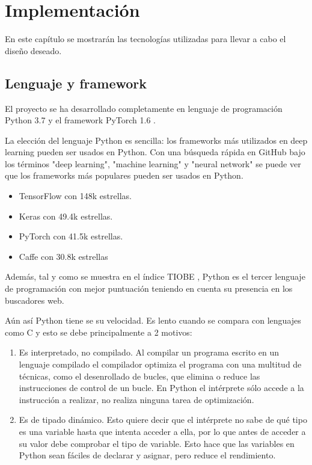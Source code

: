 \chapter{Implementación}\label{implementacion}

En este capítulo se mostrarán las tecnologías utilizadas para llevar a cabo el diseño deseado.

\section{Lenguaje y framework}\label{sec:language_framework}

El proyecto se ha desarrollado completamente en lenguaje de programación Python 3.7 y el framework PyTorch 1.6 \cite{Paszke2019}.

La elección del lenguaje Python es sencilla: los frameworks más utilizados en deep learning pueden ser usados en Python. Con una búsqueda rápida en GitHub bajo los términos "deep learning", "machine learning" y "neural network" se puede ver que los frameworks más populares pueden ser usados en Python.
\begin{itemize}
\item TensorFlow con 148k estrellas.
\item Keras con 49.4k estrellas.
\item PyTorch con 41.5k estrellas.
\item Caffe con 30.8k estrellas
\end{itemize}

Además, tal y como se muestra en el índice TIOBE \cite{Tiobe2020}, Python es el tercer lenguaje de programación con mejor puntuación teniendo en cuenta su presencia en los buscadores web.

Aún así Python tiene se su velocidad. Es lento cuando se compara con lenguajes como C y esto se debe principalmente a 2 motivos:
\begin{enumerate}
\item Es interpretado, no compilado. Al compilar un programa escrito en un lenguaje compilado el compilador optimiza el programa con una multitud de técnicas, como el desenrollado de bucles, que elimina o reduce las instrucciones de control de un bucle. En Python el intérprete sólo accede a la instrucción a realizar, no realiza ninguna tarea de optimización.
\item Es de tipado dinámico. Esto quiere decir que el intérprete no sabe de qué tipo es una variable hasta que intenta acceder a ella, por lo que antes de acceder a su valor debe comprobar el tipo de variable. Esto hace que las variables en Python sean fáciles de declarar y asignar, pero reduce el rendimiento.
\end{enumerate}

